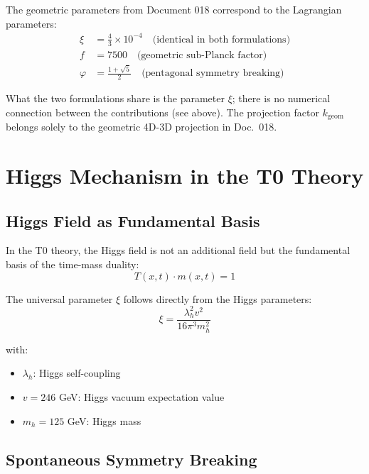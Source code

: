 	The geometric parameters from Document 018 correspond to the Lagrangian parameters:
	\begin{align}
		\xi &= \frac{4}{3} \times 10^{-4} \quad \text{(identical in both formulations)} \label{eq:xi_correspondence} \\
		f &= 7500 \quad \text{(geometric sub-Planck factor)} \label{eq:f_correspondence} \\
		\varphi &= \frac{1+\sqrt{5}}{2} \quad \text{(pentagonal symmetry breaking)} \label{eq:phi_correspondence}
	\end{align}
	
	What the two formulations share is the parameter $\xi$; there is no numerical connection between the contributions (see above). The projection factor $k_{\text{geom}}$ belongs solely to the geometric 4D-3D projection in Doc.~018.
	
	\section{Higgs Mechanism in the T0 Theory}
	
	\subsection{Higgs Field as Fundamental Basis}
	
	In the T0 theory, the Higgs field is not an additional field but the fundamental basis of the time-mass duality:
	\begin{equation}
		T(x,t) \cdot m(x,t) = 1
		\label{eq:higgs_foundation}
	\end{equation}
	
	The universal parameter $\xi$ follows directly from the Higgs parameters:
	\begin{equation}
		\boxed{\xi = \frac{\lambda_h^2 v^2}{16\pi^3 m_h^2}}
		\label{eq:xi_from_higgs}
	\end{equation}
	
	with:
	\begin{itemize}
		\item $\lambda_h$: Higgs self-coupling
		\item $v = 246$ GeV: Higgs vacuum expectation value
		\item $m_h = 125$ GeV: Higgs mass
	\end{itemize}
	
	\subsection{Spontaneous Symmetry Breaking}
	
